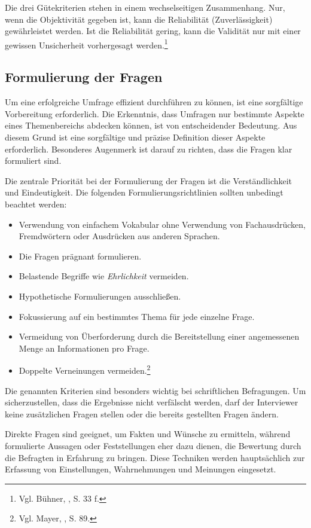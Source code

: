 Die drei Gütekriterien stehen in einem wechselseitigen Zusammenhang. Nur, wenn die Objektivität gegeben ist, kann die
Reliabilität (Zuverlässigkeit) gewährleistet werden. Ist die Reliabilität gering, kann die Validität nur mit einer gewissen Unsicherheit
vorhergesagt werden.\footnote{Vgl. Bühner, \cite{Einfuehrung in die Test- und Fragebogenkonstruktion}, S. 33 f.}

\subsection{Formulierung der Fragen}
Um eine erfolgreiche Umfrage effizient durchführen zu können, ist eine sorgfältige Vorbereitung erforderlich. Die
Erkenntnis, dass Umfragen nur bestimmte Aspekte eines Themenbereichs abdecken können, ist von entscheidender Bedeutung.
Aus diesem Grund ist eine sorgfältige und präzise Definition dieser Aspekte erforderlich. Besonderes Augenmerk ist darauf
zu richten, dass die Fragen klar formuliert sind.

Die zentrale Priorität bei der Formulierung der Fragen ist die Verständlichkeit und Eindeutigkeit. Die folgenden
Formulierungsrichtlinien sollten unbedingt beachtet werden:
\begin{itemize}
    \item Verwendung von einfachem Vokabular ohne Verwendung von Fachausdrücken, Fremdwörtern oder Ausdrücken aus anderen Sprachen.
    \item Die Fragen prägnant formulieren.
    \item Belastende Begriffe wie \textit{Ehrlichkeit} vermeiden.
    \item Hypothetische Formulierungen ausschließen.
    \item Fokussierung auf ein bestimmtes Thema für jede einzelne Frage.
    \item Vermeidung von Überforderung durch die Bereitstellung einer angemessenen Menge an Informationen pro Frage.
    \item Doppelte Verneinungen vermeiden.\footnote{Vgl. Mayer, \cite{Interview und schriftliche Befragung}, S. 89.}\\
\end{itemize}

Die genannten Kriterien sind besonders wichtig bei schriftlichen Befragungen. Um sicherzustellen, dass die Ergebnisse nicht
verfälscht werden, darf der Interviewer keine zusätzlichen Fragen stellen oder die bereits gestellten Fragen ändern.

Direkte Fragen sind geeignet, um Fakten und Wünsche zu ermitteln, während formulierte Aussagen oder Feststellungen eher
dazu dienen, die Bewertung durch die Befragten in Erfahrung zu bringen. Diese Techniken werden hauptsächlich zur Erfassung
von Einstellungen, Wahrnehmungen und Meinungen eingesetzt.


